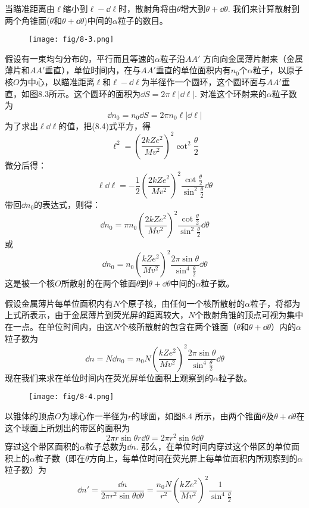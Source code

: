 当瞄准距离由$\ell$缩小到$\ell-\dd\ell$时，散射角将由$\theta$增大到$\theta+\dd\theta$. 我们来计算散射到两个角锥面($\theta$和$\theta+\dd\theta$)中间的$\alpha$粒子的数目。

\begin{figure}[htp]
    \centering
    \texttt{[image: fig/8-3.png]}
    \caption{}
\end{figure}

假设有一束均匀分布的，平行而且等速的$\alpha$粒子沿$AA'$
方向向金属薄片射来（金属薄片和$AA'$垂直），单位时间内，在与$AA'$垂直的单位面积内有$n_0$个$\alpha$粒子，以原子核$O$为中心，以瞄准距离$\ell$和$\ell-\dd\ell$为半径作一个圆环，这个圆环面与$AA'$垂直，如图8.3所示。这个圆环的面积为$\dd S=2\pi\ell|\dd\ell|$.
对准这个环射来的$\alpha$粒子数为
\[\dd n_0=n_0\dd S=2\pi n_0\ell|\dd\ell|\]
为了求出$\ell\dd\ell$的值，把(8.4)式平方，得
\[\ell^2=\left(\frac{2kZe^2}{Mv^2}\right)^2\cot^2\frac{\theta}{2}\]
微分后得：
\[\ell \dd \ell=-\frac{1}{2}\left(\frac{2kZe^2}{Mv^2}\right)^2\frac{\cot\frac{\theta}{2}}{\sin^2\frac{\theta}{2}}\dd\theta \]
带回$\dd n_0$的表达式，则得：
\[\dd n_0=\pi n_0\left(\frac{2kZe^2}{Mv^2}\right)^2\frac{\cot\frac{\theta}{2}}{\sin^2\frac{\theta}{2}}\dd\theta \]
或
\[\dd n_0=n_0\left(\frac{kZe^2}{Mv^2}\right)^2\frac{2\pi \sin\theta}{\sin^4\frac{\theta}{2}}\dd\theta\]
这是被一个核$O$所散射的在两个锥面$\theta$到$\theta+\dd \theta$中间的$\alpha$粒子数。

假设金属薄片每单位面积内有$N$个原子核，由任何一个核所散射的$\alpha$粒子，将都为上式所表示，由于金属薄片到荧光屏的距离较大，$N$个散射角锥的顶点可视为集中在一点。在单位时间内，由这$N$个核所散射的包含在两个锥面（$\theta$和$\theta+\dd\theta$）内的$\alpha$粒子数为
\begin{equation}
    \dd n=N\dd n_0=n_0N \left(\frac{kZe^2}{Mv^2}\right)^2\frac{2\pi \sin\theta}{\sin^4\frac{\theta}{2}}\dd\theta
\end{equation}
现在我们来求在单位时间内在荧光屏单位面积上观察到的$\alpha$粒子数。

\begin{figure}[htp]
    \centering
    \texttt{[image: fig/8-4.png]}
    \caption{}
\end{figure}

以锥体的顶点$O$为球心作一半径为$r$的球面，如图8.4
所示，由两个锥面$\theta$及$\theta+\dd\theta$在这个球面上所划出的带区的面积为
\[2\pi r\sin\theta r\dd\theta =2\pi r^2\sin\theta\dd\theta\]
穿过这个带区面积的$\alpha$粒子总数为$\dd n$. 那么，在单位时间内穿过这个带区的单位面积上的$\alpha$粒子数（即在$\theta$方向上，每单位时间在荧光屏上每单位面积内所观察到的$\alpha$粒子数）为
\begin{equation}
    \dd n'=\frac{\dd n}{2\pi r^2\sin\theta\dd\theta}=\frac{n_0 N}{r^2}\left(\frac{kZe^2}{Mv^2}\right)^2\frac{1}{\sin^4\frac{\theta}{2}}
\end{equation}

